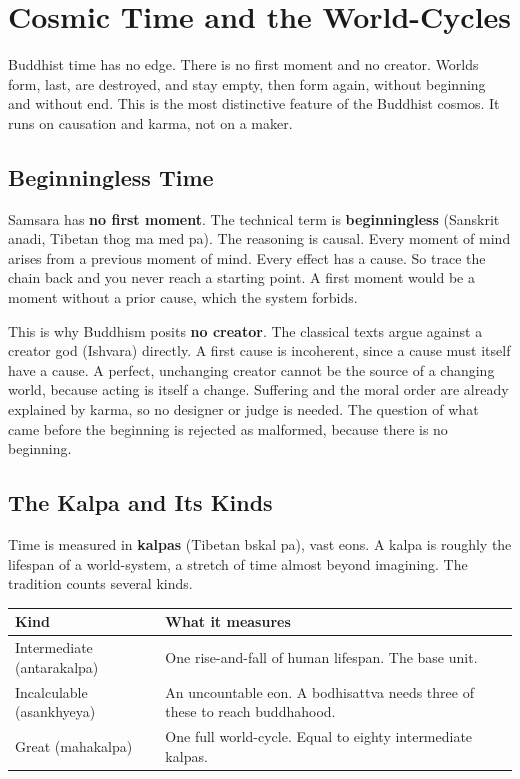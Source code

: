 \section{Cosmic Time and the World-Cycles}

Buddhist time has no edge. There is no first moment and no creator. Worlds form, last, are destroyed, and stay empty, then form again, without beginning and without end. This is the most distinctive feature of the Buddhist cosmos. It runs on causation and karma, not on a maker.

\subsection{Beginningless Time}

Samsara has \textbf{no first moment}. The technical term is \textbf{beginningless} (Sanskrit anadi, Tibetan thog ma med pa). The reasoning is causal. Every moment of mind arises from a previous moment of mind. Every effect has a cause. So trace the chain back and you never reach a starting point. A first moment would be a moment without a prior cause, which the system forbids.

This is why Buddhism posits \textbf{no creator}. The classical texts argue against a creator god (Ishvara) directly. A first cause is incoherent, since a cause must itself have a cause. A perfect, unchanging creator cannot be the source of a changing world, because acting is itself a change. Suffering and the moral order are already explained by karma, so no designer or judge is needed. The question of what came before the beginning is rejected as malformed, because there is no beginning.

\subsection{The Kalpa and Its Kinds}

Time is measured in \textbf{kalpas} (Tibetan bskal pa), vast eons. A kalpa is roughly the lifespan of a world-system, a stretch of time almost beyond imagining. The tradition counts several kinds.

\begin{longtable}{@{}
L{3.4cm}L{8.0cm}@{}}
\toprule
Kind & What it measures \\
\midrule
Intermediate (antarakalpa) & One rise-and-fall of human lifespan. The base unit. \\
Incalculable (asankhyeya) & An uncountable eon. A bodhisattva needs three of these to reach buddhahood. \\
Great (mahakalpa) & One full world-cycle. Equal to eighty intermediate kalpas. \\
\bottomrule
\end{longtable}

